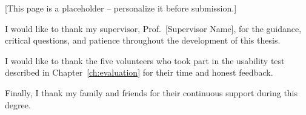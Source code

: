 
[This page is a placeholder -- personalize it before submission.]

I would like to thank my supervisor, Prof.\ [Supervisor Name], for the
guidance, critical questions, and patience throughout the development of
this thesis.

I would like to thank the five volunteers who took part in the usability
test described in Chapter~\ref{ch:evaluation} for their time and honest
feedback.

Finally, I thank my family and friends for their continuous support during
this degree.

